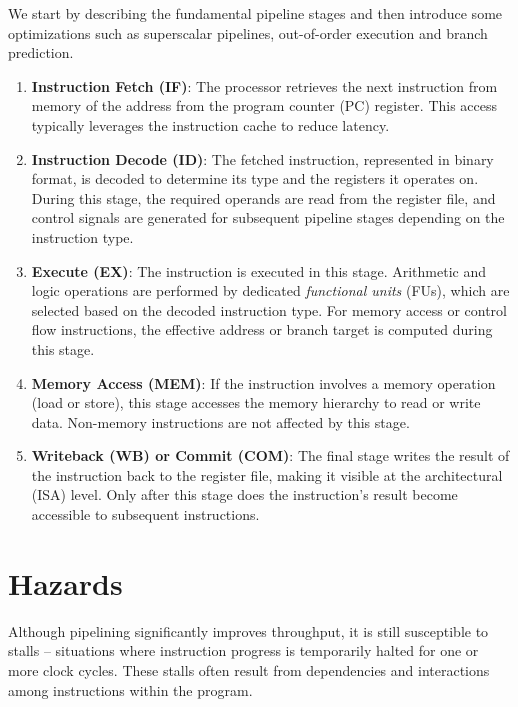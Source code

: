 We start by describing the fundamental pipeline stages and then introduce some optimizations such as superscalar pipelines, out-of-order execution and branch prediction.

\begin{enumerate}
    \item \textbf{Instruction Fetch (IF)}: The processor retrieves the next instruction from memory of the address from the program counter (PC) register. This access typically leverages the instruction cache to reduce latency.

    \item \textbf{Instruction Decode (ID)}: The fetched instruction, represented in binary format, is decoded to determine its type and the registers it operates on. During this stage, the required operands are read from the register file, and control signals are generated for subsequent pipeline stages depending on the instruction type.

    \item \textbf{Execute (EX)}: The instruction is executed in this stage. Arithmetic and logic operations are performed by dedicated \textit{functional units} (FUs), which are selected based on the decoded instruction type. For memory access or control flow instructions, the effective address or branch target is computed during this stage.

    \item \textbf{Memory Access (MEM)}: If the instruction involves a memory operation (load or store), this stage accesses the memory hierarchy to read or write data. Non-memory instructions are not affected by this stage.

    \item \textbf{Writeback (WB) or Commit (COM)}: The final stage writes the result of the instruction back to the register file, making it visible at the architectural (ISA) level. Only after this stage does the instruction's result become accessible to subsequent instructions.
\end{enumerate}


\section{Hazards}

Although pipelining significantly improves throughput, it is still susceptible to stalls -- situations where instruction progress is temporarily halted for one or more clock cycles. These stalls often result from dependencies and interactions among instructions within the program. 

